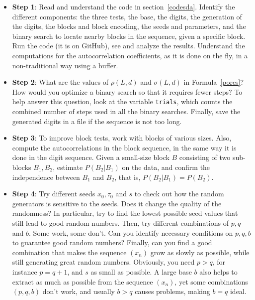 \documentclass[oneside,10pt]{book}
\begin{document}
\begin{itemize}
\item[] {\bf Step 1}:  Read and understand the code in section~\ref{codesda}. Identify the different components: the three tests, the base, the digits, the generation of the digits, the blocks and block encoding, the seeds and parameters, and the binary search to locate nearby blocks in the sequence, given a specific block. Run the code (it is on GitHub), see and analyze the results. Understand the computations for the autocorrelation  coefficients, 
 as it is done on the fly, in a non-traditional way using a buffer. 
\vspace{1ex}

\item[] {\bf Step 2}: What are the values of $\rho(L, d)$ and $\sigma(L,d)$ in Formula~\ref{pores}? How would you optimize a binary search so that it requires fewer steps? To help answer this question, look at the variable \texttt{trials}, which counts the combined number of steps used in all the binary searches. Finally, save the generated digits in a file if the sequence is not too long.
\vspace{1ex}

\item[] {\bf Step 3}: To improve block tests, work with blocks of various sizes. Also, compute the autocorrelations in the block sequence, in the same way it is done in the digit sequence. Given a small-size block $B$ consisting of two sub-blocks $B_1, B_2$, estimate
 $P(B_2 | B_1)$ on the data, and confirm the independence between $B_1$ and $B_2$, that is, $P(B_2 | B_1) = P(B_2)$. 
\vspace{1ex}

\item {\bf Step 4}: Try different seeds $x_0, \tau_0$ and $s$ to check out how the random generators is sensitive to the seeds. Does it change the quality
 of the randomness? In particular, try to find the lowest possible seed values that still lead to good random numbers. Then, try different combinations of $p,q$ and $b$. Some work, some don't. Can you identify necessary conditions on $p, q, b$ to guarantee good random numbers?
Finally, can you find a good combination that makes the sequence $(x_n)$ grow as slowly as possible, while still generating great random numbers. Obviously, you need $p > q$, for instance $p = q+1$, and $s$ as small as possible. A large base $b$ also helps to extract as much as possible
 from the sequence $(x_n)$, yet some combinations $(p, q, b)$ don't work, and usually $b>q$ causes problems, making $b=q$ ideal.
\end{itemize}
\end{document}
